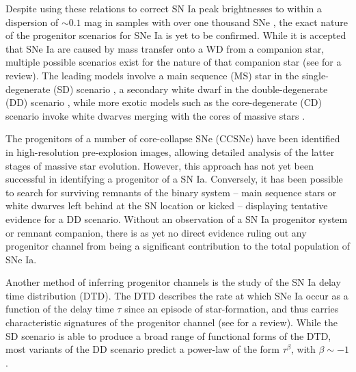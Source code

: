 \documentclass[fleqn,usenatbib]{mnras}
\begin{document}
Despite using these relations to correct SN Ia peak brightnesses to within a dispersion of $\sim 0.1$ mag in samples with over one thousand SNe \citep{Scolnic2018}, the exact nature of the progenitor scenarios for SNe Ia is yet to be confirmed. While it is accepted that SNe Ia are caused by mass transfer onto a WD from a companion star, multiple possible scenarios exist for the nature of that companion star (see \citealt{Maoz2014} for a review). The leading models involve a main sequence (MS) star in the single-degenerate (SD) scenario \citep{Whelan1973,Nomoto1982}, a secondary white dwarf in the double-degenerate (DD) scenario \citep{Tutukov1976,Iben1984,Webbink1984}, while more exotic models such as the core-degenerate (CD) scenario invoke white dwarves merging with the cores of massive stars \citep{Soker2019}. 

The progenitors of a number of core-collapse SNe (CCSNe) have been identified in high-resolution pre-explosion images, allowing detailed analysis of the latter stages of massive star evolution. However, this approach has not yet been successful in identifying a progenitor of a SN Ia. Conversely, it has been possible to search for surviving remnants of the binary system -- main sequence stars or white dwarves left behind at the SN location or kicked \citep{Shen2018} -- displaying tentative evidence for a DD scenario. Without an observation of a SN Ia progenitor system or remnant companion, there is as yet no direct evidence ruling out any progenitor channel from being a significant contribution to the total population of SNe Ia.

Another method of inferring progenitor channels is the study of the SN Ia delay time distribution (DTD). The DTD describes the rate at which SNe Ia occur as a function of the delay time $\tau$ since an episode of star-formation, and thus carries characteristic signatures of the progenitor channel (see \citealt{Wang2012} for a review). While the SD scenario is able to produce a broad range of functional forms of the DTD, most variants of the DD scenario predict a power-law of the form $\tau^{\beta}$, with $\beta \sim -1$ \citep[e.g][]{Ruiter2009,Mennekens2010}.
\end{document}
